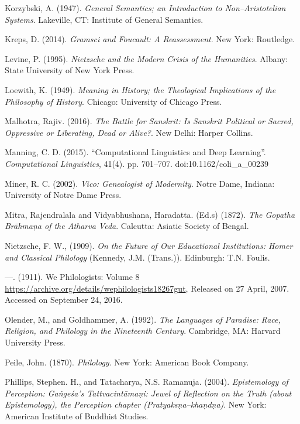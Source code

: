 \begin{thebibliography}{99}
  Korzybski, A. (1947). \textit{General Semantics; an Introduction to Non–Aristotelian Systems}. Lakeville, CT: Institute of General Semantics.

  Kreps, D. (2014). \textit{Gramsci and Foucault: A Reassessment}. New York: Routledge.

  Levine, P. (1995). \textit{Nietzsche and the Modern Crisis of the Humanities}. Albany: State University of New York Press.

  Loewith, K. (1949). \textit{Meaning in History; the Theological Implications of the Philosophy of History}. Chicago: University of Chicago Press.

  Malhotra, Rajiv. (2016). \textit{The Battle for Sanskrit: Is Sanskrit Political or Sacred, Oppressive or Liberating, Dead or Alive?}. New Delhi: Harper Collins.

  Manning, C. D. (2015). “Computational Linguistics and Deep Learning”. \textit{Computational Linguistics}, 41(4). pp. 701–707. doi:10.1162/coli\_a\_00239

  Miner, R. C. (2002). \textit{Vico: Genealogist of Modernity}. Notre Dame, Indiana: University of Notre Dame Press.

  Mitra, Rajendralala and Vidyabhushana, Haradatta. (Ed.s) (1872). \textit{The Gopatha Brāhmaṇa of the Atharva Veda}. Calcutta: Asiatic Society of Bengal.

  Nietzsche, F. W., (1909). \textit{On the Future of Our Educational Institutions: Homer and Classical Philology} (Kennedy, J.M. (Trans.)). Edinburgh: T.N. Foulis.

  —. (1911). We Philologists: Volume 8 \url{ https://archive.org/details/wephilologists18267gut}, Released on 27 April, 2007. Accessed on September 24, 2016.

  Olender, M., and Goldhammer, A. (1992). \textit{The Languages of Paradise: Race, Religion, and Philology in the Nineteenth Century}. Cambridge, MA: Harvard University Press.

  Peile, John. (1870). \textit{Philology}. New York: American Book Company.

  Phillips, Stephen. H., and Tatacharya, N.S. Ramanuja. (2004). \textit{Epistemology of Perception: Gaṅgeśa's Tattvacintāmaṇi: Jewel of Reflection on the Truth (about Epistemology), the Perception chapter (Pratyaksṇa–khaṇdṇa)}. New York: American Institute of Buddhist Studies.


\end{thebibliography}
